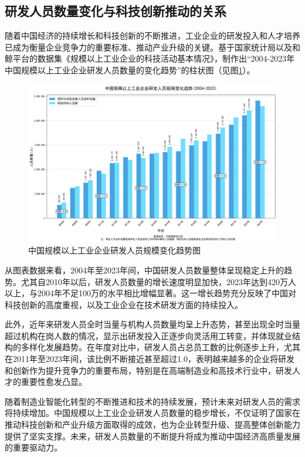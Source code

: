 \subsection{研发人员数量变化与科技创新推动的关系}
随着中国经济的持续增长和科技创新的不断推进，工业企业的研发投入和人才培养已成为衡量企业竞争力的重要标准、推动产业升级的关键。基于国家统计局以及和鲸平台的数据集《规模以上工业企业的科技活动基本情况》，制作出“2004-2023年中国规模以上工业企业研发人员数量的变化趋势”的柱状图（见图\ref{中国规模以上工业企业研发人员规模变化趋势图}）。
\begin{figure}[H]
    \centering
    \includegraphics[width=0.6\linewidth]{figure/19中国规模以上工业企业研发人员规模变化趋势图.png}
    \caption{中国规模以上工业企业研发人员规模变化趋势图}
    \label{中国规模以上工业企业研发人员规模变化趋势图}
\end{figure}
从图表数据来看，2004年至2023年间，中国研发人员数量整体呈现稳定上升的趋势。尤其自2010年以后，研发人员数量的增长速度明显加快，2023年达到420万人以上，与2004年不足100万的水平相比增幅显著。这一增长趋势充分反映了中国对科技创新的高度重视，以及工业企业在技术研发方面的持续投入。

此外，近年来研发人员全时当量与机构人员数量均呈上升态势，甚至出现全时当量超过机构在岗人数的情况，显示出研发投入正逐步向灵活用工转变，并体现就业结构的多样化发展趋势。在年度对比中，研发人员占总员工数的比例逐步上升，尤其在2011年至2023年间，该比例不断接近甚至超过1.0，表明越来越多的企业将研发和创新作为提升竞争力的重要布局，特别是在高端制造业和高技术行业中，研发人才的重要性愈发凸显。\cite{li2023rd}

随着制造业智能化转型的不断推进和技术的持续发展，预计未来对研发人员的需求将持续增加。中国规模以上工业企业研发人员数量的稳步增长，不仅证明了国家在推动科技创新和产业升级方面取得的成效，也为企业转型升级、提高整体创新能力提供了坚实支撑。未来，研发人员数量的不断提升将成为推动中国经济高质量发展的重要驱动力。

